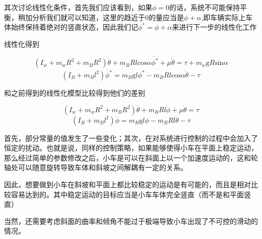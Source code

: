 \documentclass[UTF8,a4paper]{paper}
\begin{document}
其次讨论线性化条件，首先我们应该看到，如果$\phi=0$的话，系统不可能保持平衡，稍加分析我们就可以知道，这里的趋近于0的量应当是$\phi+\alpha$,即车辆实际上车体始终保持着绝对的竖直状态，因此我们记$\phi^*=\phi+\alpha$来进行下一步的线性化工作

线性化得到

\begin{equation}
(I_w+m_wR^2+m_BR^2)\ddot{\theta}+m_BRl\mathrm{cos}\alpha\ddot{\phi^*}+\mu\dot{\theta}=\tau+m_w\mathrm{g}R\mathrm{sin}\alpha
\end{equation}
\begin{equation}
(I_B+m_Bl^2)\ddot{\phi^*}=m_B\mathrm{g}l\phi^*-m_BRl\mathrm{cos}\alpha\ddot{\theta}-\tau
\end{equation}

和之前得到的线性化模型比较得到他们的差别

\begin{equation}
(I_w+m_wR^2+m_BR^2)\ddot{\theta}+m_BRl\ddot{\phi}+\mu\dot{\theta}=\tau
\label{16}
\end{equation}
\begin{equation}
(I_B+m_Bl^2)\ddot{\phi}=m_B\mathrm{g}l\phi-m_BRl\ddot{\theta}-\tau
\label{17}
\end{equation}

首先，部分常量的值发生了一些变化；其次，在对系统进行控制的过程中会加入了恒定的扰动。也就是说，同样的控制策略，如果能够使得小车在平面上稳定运动，那么经过简单的参数修改之后，小车是可以在斜面上以一个加速度运动的，这和轮轴处可以随意旋转导致车体和斜坡之间解耦有一定的关系。

因此，想要做到小车在斜坡和平面上都比较稳定的运动是有可能的，而且是相对比较容易达到的。其中稳定运动的目标应当是小车车体完全竖直（而不是和平面竖直）

当然，还需要考虑斜面的曲率和倾角不能过于极端导致小车出现了不可控的滑动的情况。
\end{document}

